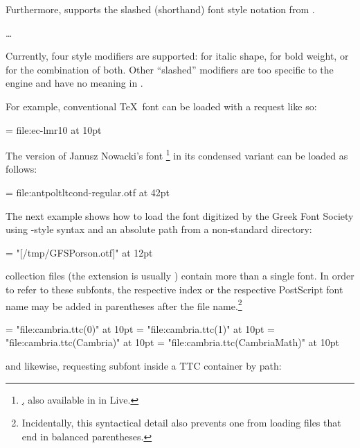 Furthermore,  supports the slashed (shorthand)
font style notation from \XETEX.

\beginnarrower
  \nonproportional{\string\font\string\fontname\space= }%
  \nonproportional{/}%
  \dots
\endnarrower

\noindent
Currently, four style modifiers are supported:
   for italic shape,
   for bold   weight,
   or  for the combination of both.
%
Other “slashed” modifiers are too specific to the \XETEX engine and
have no meaning in \LUATEX.

\endsubsection



For example, conventional \TeX\ font can be loaded with a
 request like so:

\beginlisting
  \font \lmromanten = {file:ec-lmr10} at 10pt
\endlisting

The \OpenType version of Janusz Nowacki’s font \footnote{%
  \hyperlink {http://jmn.pl/antykwa-poltawskiego/}, also available in
  in \TEX Live.
}
in its condensed variant can be loaded as follows:

\beginlisting
  \font \apcregular = file:antpoltltcond-regular.otf at 42pt
\endlisting

The next example shows how to load the  font digitized by
the Greek Font Society using \XETEX-style syntax and an absolute path from a
non-standard directory:

\beginlisting
  \font \gfsporson = "[/tmp/GFSPorson.otf]" at 12pt
\endlisting

 collection files (the extension is usually
) contain more than a single font. In order to refer to these
subfonts, the respective index or the respective PostScript font name may be
added in parentheses after the file name.\footnote{%
  Incidentally, this syntactical detail also prevents one from loading files
  that end in balanced parentheses.
}

\beginlisting
  \font \cambriamain = "file:cambria.ttc(0)" at 10pt
  \font \cambriamath = "file:cambria.ttc(1)" at 10pt
  \font \Cambriamain = "file:cambria.ttc(Cambria)" at 10pt
  \font \Cambriamath = "file:cambria.ttc(CambriaMath)" at 10pt
\endlisting

and likewise, requesting subfont inside a TTC container by path:


